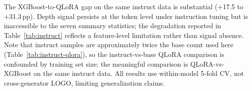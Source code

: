 \begin{table}[ht]
\centering
\small
\caption{End-to-end QLoRA vs.\ XGBoost on instruction-tuned data (within-model 5-fold CV, Qwen3-0.6B backbone). Base QLoRA rows shown for reference only; instruct sets ($N{\approx}4.4$--$5.0$K) are approximately twice the base sets ($N{\approx}2.3$K), so cross-condition comparison is confounded by training set size.}
\label{tab:instruct-qlora}
\end{table}

The XGBoost-to-QLoRA gap on the same instruct data is substantial ($+$17.5 to $+$31.3\,pp). Depth signal persists at the token level under instruction tuning but is inaccessible to the seven summary statistics; the degradation reported in Table~\ref{tab:instruct} reflects a feature-level limitation rather than signal absence.
Note that instruct samples are approximately twice the base count used here (Table~\ref{tab:instruct-qlora}), so the instruct-vs-base QLoRA comparison is confounded by training set size; the meaningful comparison is QLoRA-vs-XGBoost on the same instruct data.
All results use within-model 5-fold CV, not cross-generator LOGO, limiting generalization claims.
